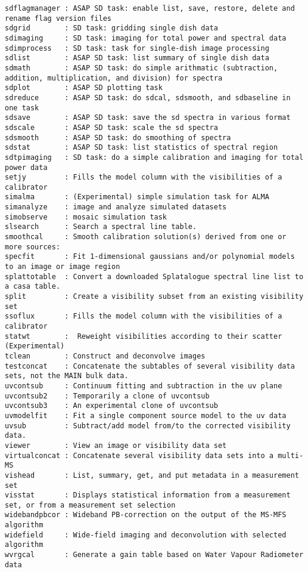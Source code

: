 \begin{verbatim}
sdflagmanager : ASAP SD task: enable list, save, restore, delete and rename flag version files
sdgrid        : SD task: gridding single dish data
sdimaging     : SD task: imaging for total power and spectral data
sdimprocess   : SD task: task for single-dish image processing
sdlist        : ASAP SD task: list summary of single dish data
sdmath        : ASAP SD task: do simple arithmatic (subtraction, addition, multiplication, and division) for spectra
sdplot        : ASAP SD plotting task 
sdreduce      : ASAP SD task: do sdcal, sdsmooth, and sdbaseline in one task
sdsave        : ASAP SD task: save the sd spectra in various format
sdscale       : ASAP SD task: scale the sd spectra
sdsmooth      : ASAP SD task: do smoothing of spectra
sdstat        : ASAP SD task: list statistics of spectral region
sdtpimaging   : SD task: do a simple calibration and imaging for total power data 
setjy         : Fills the model column with the visibilities of a calibrator
simalma       : (Experimental) simple simulation task for ALMA 
simanalyze    : image and analyze simulated datasets
simobserve    : mosaic simulation task
slsearch      : Search a spectral line table.
smoothcal     : Smooth calibration solution(s) derived from one or more sources:
specfit       : Fit 1-dimensional gaussians and/or polynomial models to an image or image region
splattotable  : Convert a downloaded Splatalogue spectral line list to a casa table.
split         : Create a visibility subset from an existing visibility set
ssoflux       : Fills the model column with the visibilities of a calibrator
statwt        :  Reweight visibilities according to their scatter (Experimental)
tclean        : Construct and deconvolve images
testconcat    : Concatenate the subtables of several visibility data sets, not the MAIN bulk data.
uvcontsub     : Continuum fitting and subtraction in the uv plane
uvcontsub2    : Temporarily a clone of uvcontsub
uvcontsub3    : An experimental clone of uvcontsub
uvmodelfit    : Fit a single component source model to the uv data
uvsub         : Subtract/add model from/to the corrected visibility data.
viewer        : View an image or visibility data set
virtualconcat : Concatenate several visibility data sets into a multi-MS
vishead       : List, summary, get, and put metadata in a measurement set
visstat       : Displays statistical information from a measurement set, or from a measurement set selection
widebandpbcor : Wideband PB-correction on the output of the MS-MFS algorithm
widefield     : Wide-field imaging and deconvolution with selected algorithm
wvrgcal       : Generate a gain table based on Water Vapour Radiometer data

\end{verbatim}
\normalsize

